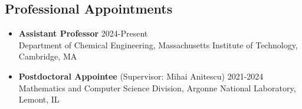 \documentclass[letterpaper, 11pt]{article}
\begin{document}
\subsection*{Professional Appointments}
\begin{itemize}[itemsep=1pt, parsep=0pt,leftmargin=*]
\item[] {\bf Assistant Professor} \hfill 2024-Present\\
  Department of Chemical Engineering, Massachusetts Institute of Technology, Cambridge, MA  
\item[] {\bf Postdoctoral Appointee} (Supervisor: Mihai Anitescu) \hfill 2021-2024\\
  Mathematics and Computer Science Division, Argonne National Laboratory, Lemont, IL
\end{itemize}
\end{document}
